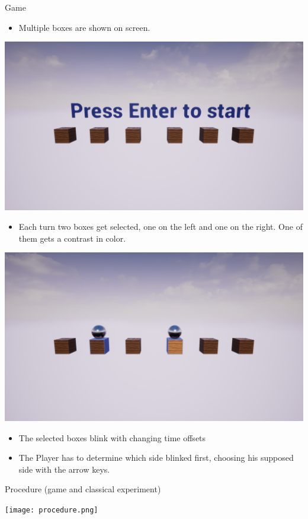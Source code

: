 \documentclass[a0paper,portrait]{baposter}
\begin{document}
\begin{poster}
		\begin{posterbox}[name=game,span=1,column=1,row=1,below=intro]{Game}
			\begin{itemize}
				\item Multiple boxes are shown on screen.
			\end{itemize}
			\includegraphics[width=1\textwidth]{Screenshots/gameStart.png}
			\begin{itemize}
				\item Each turn two boxes get selected, one on the left and one on the right. One of them gets a contrast in color.
			\end{itemize}
			\includegraphics[width=1 \textwidth]{Screenshots/bothStimuli.png}
			\begin{itemize}
				\item The selected boxes blink with changing time offsets
			\end{itemize}
			\begin{itemize}
				\item The Player has to determine which side blinked first, choosing his supposed side with the arrow keys.
			\end{itemize}
		\end{posterbox}
		\begin{posterbox}[name=procedure,span=2,column=0,row=2, below=game]{Procedure (game and classical experiment)}
			\begin{center}
				\texttt{[image: procedure.png]}
			\end{center}
		\end{posterbox}
		

\end{poster}
\end{document}
